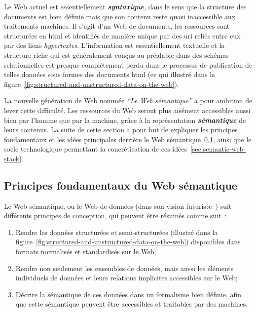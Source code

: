 

Le Web actuel est essentiellement \emph{\textbf{syntaxique}}, dans le
sens que la structure des documents est bien définie mais que son
contenu reste quasi inaccessible aux traitements machines. Il s'agit
d'un Web de documents, les ressources sont structurées en
\acrshort{html} et identifiés de manière unique par des \acrshort{uri}
reliés entre eux par des liens \emph{hypertextes}. L'information est
essentiellement textuelle et la structure riche qui est généralement
conçus au préalable dans des schémas relationnelles est presque
complètement perdu dans le processus de publication de telles données
sous formes des documents \acrshort{html} (ce qui illustré dans la
figure~\ref{fig:structured-and-unstructured-data-on-the-web}).\medskip

La nouvelle génération de Web nommée \emph{``Le Web sémantique''} a
pour ambition de lever cette difficulté. Les ressources du Web seront
plus aisément accessibles aussi bien par l'homme que par la machine,
grâce à la représentation \emph{\textbf{sémantique}} de leurs
contenus. La suite de cette section a pour but de expliquer les
principes fondamentaux et les idées principales derrière le Web
sémantique~\ref{sec:semantic-web-design-decisions}, ainsi que le socle
technologique permettant la concrétisation de ces
idées~\ref{sec:semantic-web-stack}.\medskip

\subsection{Principes fondamentaux du Web sémantique}
\label{sec:semantic-web-design-decisions}

Le Web sémantique, ou le Web de données (dans son vision
futuriste~\cite{bizer2008linked}) suit différents principes de
conception, qui peuvent être résumés comme
suit~\cite{antoniou2012semantic}:\medskip

\begin{enumerate}
\item Rendre les données structurées et semi-structurées (illustré
  dans la
  figure~\ref{fig:structured-and-unstructured-data-on-the-web})
  disponibles dans formats normalisés et standardisés sur le
  Web;\medskip

\item Rendre non seulement les ensembles de données, mais aussi les
  éléments individuels de données et leurs relations implicites
  accessibles sur le Web;\medskip

\item Décrire la sémantique de ces données dans un formalisme bien
  définie, afin que cette sémantique peuvent être accessibles et
  traitables par des machines.
\end{enumerate}

